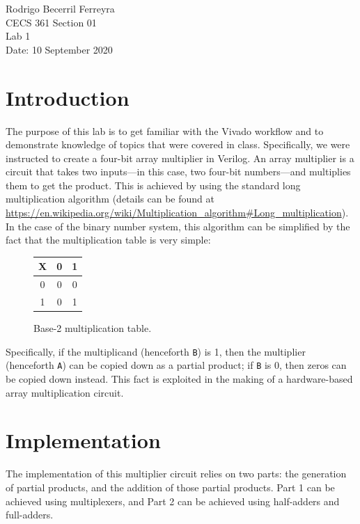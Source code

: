 \documentclass{article}
\renewcommand{\c}[1]{\texttt{#1}}
\begin{document}
    \noindent
    Rodrigo Becerril Ferreyra\\
    CECS 361 Section 01\\
    Lab 1\\
    Date: 10 September 2020

\section{Introduction} The purpose of this lab is to get
familiar with the Vivado workflow and to demonstrate knowledge
of topics that were covered in class. Specifically, we were
instructed to create a four-bit array multiplier
in Verilog. An array
multiplier is a circuit that takes two inputs---in this case,
two four-bit numbers---and multiplies them to get the
product. This is achieved by using the standard long multiplication
algorithm (details can be found at
\url{https://en.wikipedia.org/wiki/Multiplication_algorithm#Long_multiplication}).
In the case of the binary number system, this algorithm can be
simplified by the fact that the multiplication table is very
simple:

\begin{figure}[h]
    \centering
    \begin{tabular}{c | c c}
        X    & \num{0} & \num{1} \\ \hline
        \num{0} & \num{0} & \num{0} \\
        \num{1} & \num{0} & \num{1}
    \end{tabular}
    \caption{Base-2 multiplication table.}
\end{figure}

Specifically, if the multiplicand (henceforth \c{B}) is \num{1}, then
the multiplier (henceforth \c{A}) can be copied down as a partial product; if
\c{B} is \num{0}, then zeros can be
copied down instead. This fact is exploited in the making of a
hardware-based array multiplication circuit.

\section{Implementation} The implementation of this
multiplier circuit relies on two parts: the generation
of partial products, and the addition of those partial
products. Part 1 can be achieved using multiplexers,
and Part 2 can be achieved using half-adders and
full-adders.
\end{document}
